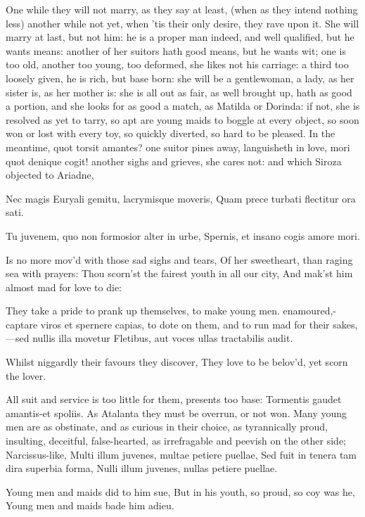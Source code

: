 {One while they will not marry, as they say at least, (when as they
intend nothing less) another while not yet, when 'tis their only
desire, they rave upon it. She will marry at last, but not him: he is a
proper man indeed, and well qualified, but he wants means: another of
her suitors hath good means, but he wants wit; one is too old, another
too young, too deformed, she likes not his carriage: a third too
loosely given, he is rich, but base born: she will be a gentlewoman, a
lady, as her sister is, as her mother is: she is all out as fair, as
well brought up, hath as good a portion, and she looks for as good a
match, as Matilda or Dorinda: if not, she is resolved as yet to tarry,
so apt are young maids to boggle at every object, so soon won or lost
with every toy, so quickly diverted, so hard to be pleased. In the
meantime, quot torsit amantes? one suitor pines away, languisheth in
love, mori quot denique cogit! another sighs and grieves, she cares
not: and which Siroza objected to Ariadne,

Nec magis Euryali gemitu, lacrymisque moveris,
Quam prece turbati flectitur ora sati.

Tu juvenem, quo non formosior alter in urbe,
Spernis, et insano cogis amore mori.


Is no more mov'd with those sad sighs and tears,
Of her sweetheart, than raging sea with prayers:
Thou scorn'st the fairest youth in all our city,
And mak'st him almost mad for love to die:

They take a pride to prank up themselves, to make young men.
enamoured,- captare viros et spernere capias, to dote on them,
and to run mad for their sakes,
---sed nullis illa movetur
Fletibus, aut voces ullas tractabilis audit.

Whilst niggardly their favours they discover,
They love to be belov'd, yet scorn the lover.

All suit and service is too little for them, presents too base:
Tormentis gaudet amantis-et spoliis. As Atalanta they must be overrun,
or not won. Many young men are as obstinate, and as curious in their
choice, as tyrannically proud, insulting, deceitful, false-hearted, as
irrefragable and peevish on the other side; Narcissus-like,
Multi illum juvenes, multae petiere puellae,
Sed fuit in tenera tam dira superbia forma,
Nulli illum juvenes, nullas petiere puellae.

Young men and maids did to him sue,
But in his youth, so proud, so coy was he,
Young men and maids bade him adieu.

}

